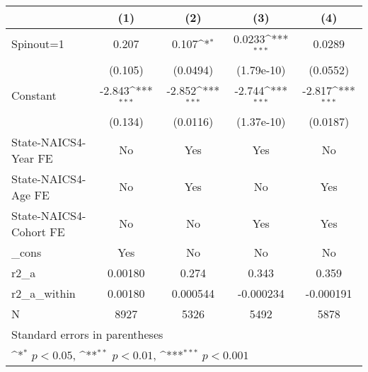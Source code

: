 {
\def\sym#1{\ifmmode^{#1}\else\(^{#1}\)\fi}
\begin{tabular}{l*{4}{c}}
\hline\hline
                    &\multicolumn{1}{c}{(1)}         &\multicolumn{1}{c}{(2)}         &\multicolumn{1}{c}{(3)}         &\multicolumn{1}{c}{(4)}         \\
\hline
Spinout=1           &       0.207         &       0.107\sym{*}  &      0.0233\sym{***}&      0.0289         \\
                    &     (0.105)         &    (0.0494)         &  (1.79e-10)         &    (0.0552)         \\
[1em]
Constant            &      -2.843\sym{***}&      -2.852\sym{***}&      -2.744\sym{***}&      -2.817\sym{***}\\
                    &     (0.134)         &    (0.0116)         &  (1.37e-10)         &    (0.0187)         \\
[1em]
State-NAICS4-Year FE&          No         &         Yes         &         Yes         &          No         \\
[1em]
State-NAICS4-Age FE &          No         &         Yes         &          No         &         Yes         \\
[1em]
State-NAICS4-Cohort FE&          No         &          No         &         Yes         &         Yes         \\
[1em]
\_cons              &         Yes         &          No         &          No         &          No         \\
\hline
r2\_a                &     0.00180         &       0.274         &       0.343         &       0.359         \\
r2\_a\_within         &     0.00180         &    0.000544         &   -0.000234         &   -0.000191         \\
N                   &        8927         &        5326         &        5492         &        5878         \\
\hline\hline
\multicolumn{5}{l}{\footnotesize Standard errors in parentheses}\\
\multicolumn{5}{l}{\footnotesize \sym{*} \(p<0.05\), \sym{**} \(p<0.01\), \sym{***} \(p<0.001\)}\\
\end{tabular}
}
